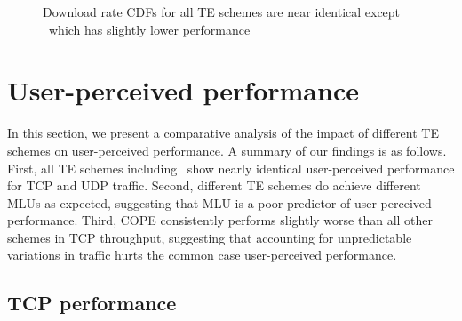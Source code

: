 \begin{figure}[tbh]
\begin{center}
  \end{center} 
  \caption{Download rate CDFs for all TE schemes are near identical except \cope\ which has slightly lower performance}
  \label{fig:throughputs_CDF}
\end{figure}

\section{User-perceived performance}
\label{sec:app_performance}
In this section, we present a comparative analysis of the impact of different TE schemes on user-perceived performance. A summary of our findings is as follows. First, all TE schemes  including \invcap\ show nearly identical user-perceived performance for TCP and UDP traffic. Second, different TE schemes do achieve different MLUs as expected, suggesting that MLU is a poor predictor of user-perceived performance. Third, COPE consistently performs slightly worse than all other schemes in TCP throughput, suggesting that accounting for unpredictable variations in traffic hurts the common case user-perceived performance.





\subsection{TCP performance}

